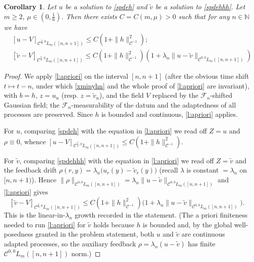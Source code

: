 \documentclass[12pt]{article}
\newtheorem{corollary}[theorem]{Corollary}
\theoremstyle{definition}
\DeclareMathOperator{\1}{\mathbbm{1}}%
\renewcommand{\ge}{\geqslant}
\renewcommand{\le}{\leqslant}
\newcommand{\wt}{\widetilde}
\newcommand{\C}{\mathcal{C}}
\newcommand{\F}{\mathcal{F}}
\newcommand{\N}{\mathbb{N}}
\begin{document}
\begin{corollary}\label{c:hmain}
Let $u$ be a solution to \eqref{spdeh} and $\wt v$ be a solution to 
\eqref{spdehhh}. Let $m\ge2$, $\mu\in(0,\frac16)$. Then there exists 
$C=C(m,\mu)>0$ such that for any $n\in\N$ we have 
\begin{align*}
&[u-V]_{\C^{\frac34,0}L_m([n,n+1])}\le  C (1+\|h\|_{\C^{-1}}^2);\\
&[\wt v-V]_{\C^{\frac34,0}L_m([n,n+1])}\le  C (1+\|h\|_{\C^{-1}}^2)(1+\lambda_n\|u-\wt v\|_{\C^{0,0} L_m([n,n+1])})
\end{align*}

 
\end{corollary}
\begin{proof}
We apply \cref{l:apriori} on the interval $[n,n+1]$ (after the obvious time
shift $t\mapsto t-n$, under which \eqref{xminyhn} and the whole proof of
\cref{l:apriori} are invariant), with $b=h$, $z=u_n$ (resp. $z=\wt v_n$), and
the field $V$ replaced by the $\F_n$-shifted Gaussian field; the
$\F_n$-measurability of the datum and the adaptedness of all processes are
preserved. Since $h$ is bounded and continuous, \cref{l:apriori} applies.

For $u$, comparing \eqref{spdeh} with the equation in \cref{l:apriori} we read
off $Z=u$ and $\rho\equiv0$, whence
$[u-V]_{\C^{\frac34,0}L_m([n,n+1])}\le C(1+\|h\|_{\C^{-1}}^2)$.

For $\wt v$, comparing \eqref{spdehhh} with the equation in \cref{l:apriori} we
read off $Z=\wt v$ and the feedback drift
$\rho(r,y)=\lambda_n\bigl(u_r(y)-\wt v_r(y)\bigr)$ (recall $\lambda$ is constant
$=\lambda_n$ on $[n,n+1)$). Hence
$\|\rho\|_{\C^{0,0}L_m([n,n+1])}=\lambda_n\|u-\wt v\|_{\C^{0,0}L_m([n,n+1])}$ and
\cref{l:apriori} gives
\[
[\wt v-V]_{\C^{\frac34,0}L_m([n,n+1])}
\le C(1+\|h\|_{\C^{-1}}^2)\bigl(1+\lambda_n\|u-\wt v\|_{\C^{0,0}L_m([n,n+1])}\bigr).
\]
This is the linear-in-$\lambda_n$ growth recorded in the statement. (The
a priori finiteness needed to run \cref{l:apriori} for $\wt v$ holds because $h$
is bounded and, by the global well-posedness granted in the problem statement,
both $u$ and $\wt v$ are continuous adapted processes, so the auxiliary feedback
$\rho=\lambda_n(u-\wt v)$ has finite $\C^{0,0}L_m([n,n+1])$ norm.)
\end{proof}
\end{document}
